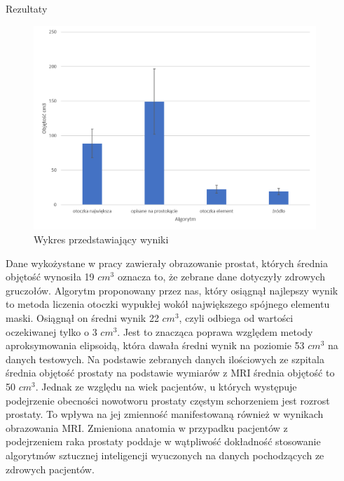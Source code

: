 \documentclass[final]{beamer}
\newlength{\sepwid}
\newlength{\threecolwid}
\begin{document}
\begin{frame}[t]
\begin{columns}[t]
    \begin{column}{\sepwid}\end{column}			%
    \begin{column}{\threecolwid}					  %
      \begin{block}{Rezultaty}
      \begin{figure}
		\caption{Wykres przedstawiający wyniki}\label{wrap-fig:1}
		\includegraphics[width=30cm]{WynikiObjetosc.png}
	\end{figure} 
        Dane wykożystane w pracy zawierały obrazowanie prostat, których średnia objętość wynosiła 19 $cm^3$ oznacza to, że zebrane dane dotyczyły zdrowych gruczołów. \newline Algorytm proponowany przez nas, który osiągnął najlepszy wynik to metoda liczenia otoczki wypukłej wokół największego spójnego elementu maski. Osiągnął on średni wynik 22 $cm^3$, czyli odbiega od wartości oczekiwanej tylko o 3 $cm^3$. \newline
         Jest to znacząca poprawa względem metody aproksymowania elipsoidą, która dawała średni wynik na poziomie 53 $cm^3$ na danych testowych. Na podstawie zebranych danych ilościowych ze szpitala średnia objętość prostaty na podstawie wymiarów z MRI średnia objętość to 50 $cm^3$. \newline 
         Jednak ze względu na wiek pacjentów, u których występuje podejrzenie obecności nowotworu prostaty częstym schorzeniem jest rozrost prostaty. To wpływa na jej zmienność manifestowaną również w wynikach obrazowania MRI. Zmieniona anatomia w przypadku pacjentów z podejrzeniem raka prostaty poddaje w wątpliwość dokładność stosowanie algorytmów sztucznej inteligencji wyuczonych na danych pochodzących ze zdrowych pacjentów.

\end{block}
\end{column}
\end{columns}
\end{frame}
\end{document}
